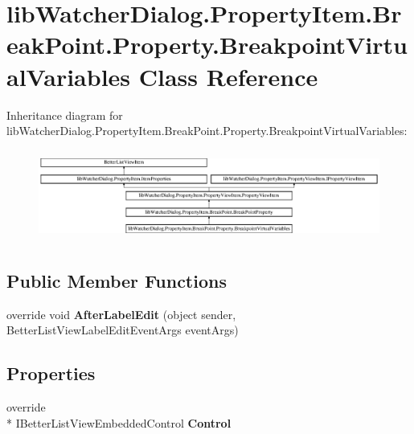 \hypertarget{classlib_watcher_dialog_1_1_property_item_1_1_break_point_1_1_property_1_1_breakpoint_virtual_variables}{\section{lib\+Watcher\+Dialog.\+Property\+Item.\+Break\+Point.\+Property.\+Breakpoint\+Virtual\+Variables Class Reference}
\label{classlib_watcher_dialog_1_1_property_item_1_1_break_point_1_1_property_1_1_breakpoint_virtual_variables}
}
Inheritance diagram for lib\+Watcher\+Dialog.\+Property\+Item.\+Break\+Point.\+Property.\+Breakpoint\+Virtual\+Variables\+:\begin{figure}[H]
\begin{center}
\leavevmode
\includegraphics[height=3.017241cm]{classlib_watcher_dialog_1_1_property_item_1_1_break_point_1_1_property_1_1_breakpoint_virtual_variables}
\end{center}
\end{figure}
\subsection*{Public Member Functions}
\begin{DoxyCompactItemize}
\item 
\hypertarget{classlib_watcher_dialog_1_1_property_item_1_1_break_point_1_1_property_1_1_breakpoint_virtual_variables_a5db7e8957746105cd0cfbfbe2910e9d3}{override void {\bfseries After\+Label\+Edit} (object sender, Better\+List\+View\+Label\+Edit\+Event\+Args event\+Args)}\label{classlib_watcher_dialog_1_1_property_item_1_1_break_point_1_1_property_1_1_breakpoint_virtual_variables_a5db7e8957746105cd0cfbfbe2910e9d3}

\end{DoxyCompactItemize}
\subsection*{Properties}
\begin{DoxyCompactItemize}
\item 
\hypertarget{classlib_watcher_dialog_1_1_property_item_1_1_break_point_1_1_property_1_1_breakpoint_virtual_variables_ac2a832d3635233a1b536fcff50f1246e}{override \\*
I\+Better\+List\+View\+Embedded\+Control {\bfseries Control}}\label{classlib_watcher_dialog_1_1_property_item_1_1_break_point_1_1_property_1_1_breakpoint_virtual_variables_ac2a832d3635233a1b536fcff50f1246e}

\end{DoxyCompactItemize}


